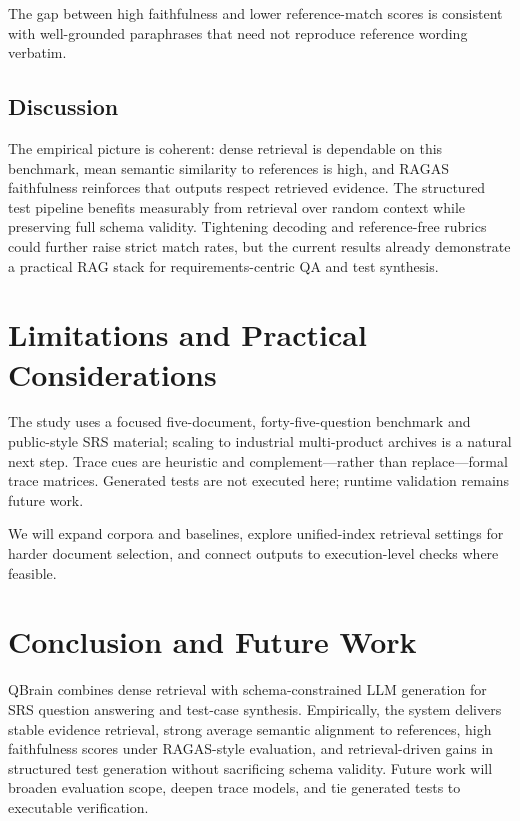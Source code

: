 \documentclass[conference]{IEEEtran}
\begin{document}
The gap between high faithfulness and lower reference-match scores is consistent with well-grounded paraphrases that need not reproduce reference wording verbatim.

\subsection{Discussion}

The empirical picture is coherent: dense retrieval is dependable on this benchmark, mean semantic similarity to references is high, and RAGAS faithfulness reinforces that outputs respect retrieved evidence. The structured test pipeline benefits measurably from retrieval over random context while preserving full schema validity. Tightening decoding and reference-free rubrics could further raise strict match rates, but the current results already demonstrate a practical RAG stack for requirements-centric QA and test synthesis.

\section{Limitations and Practical Considerations}
\label{sec:limitations}

The study uses a focused five-document, forty-five-question benchmark and public-style SRS material; scaling to industrial multi-product archives is a natural next step. Trace cues are heuristic and complement---rather than replace---formal trace matrices. Generated tests are not executed here; runtime validation remains future work.

We will expand corpora and baselines, explore unified-index retrieval settings for harder document selection, and connect outputs to execution-level checks where feasible.

\section{Conclusion and Future Work}
\label{sec:conclusion}

QBrain combines dense retrieval with schema-constrained LLM generation for SRS question answering and test-case synthesis. Empirically, the system delivers stable evidence retrieval, strong average semantic alignment to references, high faithfulness scores under RAGAS-style evaluation, and retrieval-driven gains in structured test generation without sacrificing schema validity. Future work will broaden evaluation scope, deepen trace models, and tie generated tests to executable verification.



\end{document}
